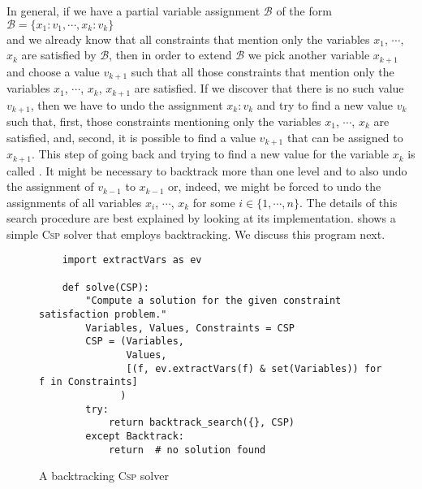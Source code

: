 In general, if we have a partial variable assignment $\mathcal{B}$ of the form
\\[0.2cm]
\hspace*{1.3cm}
$\mathcal{B} = \{ x_1:v_1, \cdots, x_k:v_k \}$
\\[0.2cm]
and we already know that all constraints that mention only the variables $x_1$, $\cdots$, $x_k$ are satisfied
by $\mathcal{B}$, then in order to extend $\mathcal{B}$ we pick another variable $x_{k+1}$ and choose a
value $v_{k+1}$ such that all those constraints that mention only the variables  $x_1$, $\cdots$, $x_k$,
$x_{k+1}$ are satisfied.  If we discover that there is no such value $v_{k+1}$, then we have to undo the
assignment $x_k:v_k$ and try to find a new value $v_k$ such that, first, those constraints mentioning only 
the variables  $x_1$, $\cdots$, $x_k$ are satisfied, and, second, it is possible to find a value $v_{k+1}$ that
can be assigned to $x_{k+1}$.  This step of going back and trying to find a new value for the variable $x_k$ is
called .  It might be necessary to backtrack more than one level and to also undo the
assignment of $v_{k-1}$ to $x_{k-1}$ or, indeed, we might be forced to undo the assignments of all variables
$x_i$, $\cdots$, $x_k$ for some $i \in \{1,\cdots, n\}$.  The details of this search procedure are best
explained by looking at its implementation.  shows a simple \textsc{Csp} solver that
employs backtracking.  We discuss this program next.

\begin{figure}[!ht]
\centering
\begin{verbatim}
    import extractVars as ev
                  
    def solve(CSP):
        "Compute a solution for the given constraint satisfaction problem."
        Variables, Values, Constraints = CSP
        CSP = (Variables,
               Values,
               [(f, ev.extractVars(f) & set(Variables)) for f in Constraints]
              )
        try:
            return backtrack_search({}, CSP)
        except Backtrack:
            return  # no solution found
\end{verbatim}
\vspace*{-0.3cm}
\caption{A backtracking \textsc{Csp} solver}
\label{fig:CSP-Solver.ipynb}
\end{figure}

